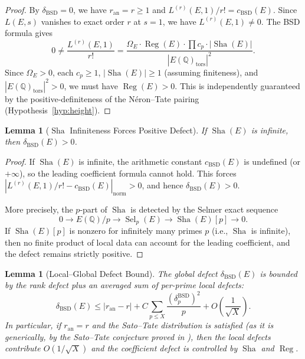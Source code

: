 \documentclass[11pt]{article}
\newtheorem{lemma}[theorem]{Lemma}
\DeclareMathOperator{\Reg}{Reg}
\DeclareMathOperator{\Sha}{Sha}
\DeclareMathOperator{\Sel}{Sel}
\begin{document}
\begin{proof}
By $\delta_{\mathrm{BSD}} = 0$, we have $r_{\mathrm{an}} = r \geq 1$ and
$L^{(r)}(E,1)/r! = c_{\mathrm{BSD}}(E)$.  Since $L(E,s)$ vanishes to exact
order $r$ at $s = 1$, we have $L^{(r)}(E,1) \neq 0$.  The BSD formula gives
\[
  0 \neq \frac{L^{(r)}(E,1)}{r!} =
  \frac{\Omega_E \cdot \Reg(E) \cdot \prod c_p \cdot |\Sha(E)|}
       {|E(\mathbb{Q})_{\mathrm{tors}}|^2}.
\]
Since $\Omega_E > 0$, each $c_p \geq 1$, $|\Sha(E)| \geq 1$ (assuming
finiteness), and $|E(\mathbb{Q})_{\mathrm{tors}}|^2 > 0$, we must have
$\Reg(E) > 0$.  This is independently guaranteed by the positive-definiteness
of the N\'eron--Tate pairing (Hypothesis~\ref{hyp:height}).
\end{proof}

\begin{lemma}[$\Sha$ Infiniteness Forces Positive Defect]
\label{lem:sha-defect}
If $\Sha(E)$ is infinite, then $\delta_{\mathrm{BSD}}(E) > 0$.
\end{lemma}

\begin{proof}
If $\Sha(E)$ is infinite, the arithmetic constant $c_{\mathrm{BSD}}(E)$ is
undefined (or $+\infty$), so the leading coefficient formula cannot hold.  This
forces $|L^{(r)}(E,1)/r! - c_{\mathrm{BSD}}(E)|_{\mathrm{norm}} > 0$, and
hence $\delta_{\mathrm{BSD}}(E) > 0$.

More precisely, the $p$-part of $\Sha$ is detected by the Selmer exact sequence
\[
  0 \to E(\mathbb{Q})/p \to \Sel_p(E) \to \Sha(E)[p] \to 0.
\]
If $\Sha(E)[p]$ is nonzero for infinitely many primes $p$ (i.e., $\Sha$ is
infinite), then no finite product of local data can account for the leading
coefficient, and the defect remains strictly positive.
\end{proof}

\begin{lemma}[Local--Global Defect Bound]
\label{lem:local-global}
The global defect $\delta_{\mathrm{BSD}}(E)$ is bounded by the rank defect plus
an averaged sum of per-prime local defects:
\[
  \delta_{\mathrm{BSD}}(E) \leq
  |r_{\mathrm{an}} - r| +
  C \sum_{p \leq X} \frac{(\delta_p^{\mathrm{BSD}})^2}{p}
  + O\!\left(\frac{1}{\sqrt{X}}\right).
\]
In particular, if $r_{\mathrm{an}} = r$ and the Sato--Tate distribution is
satisfied (as it is generically, by the Sato--Tate conjecture proved in
\cite{BGHT}), then the local defects contribute $O(1/\sqrt{X})$ and the
coefficient defect is controlled by $\Sha$ and $\Reg$.
\end{lemma}
\end{document}
